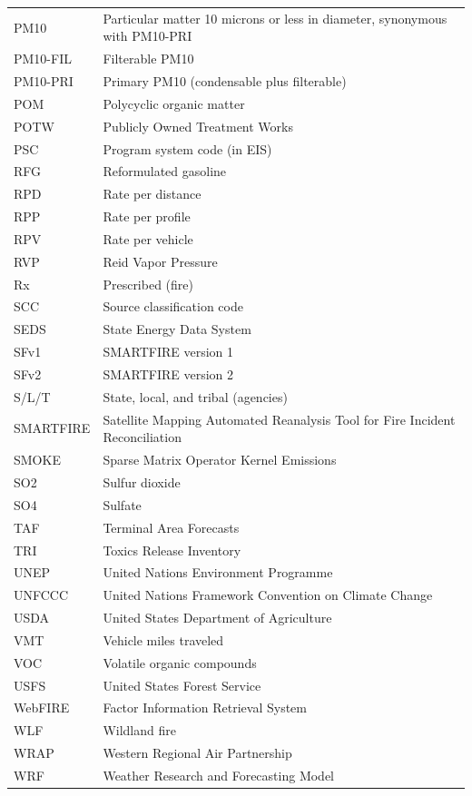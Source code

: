 \documentclass[
  11pt,
  oneside]{book}
\begin{document}
\begin{longtable}{ll}
PM10 & Particular matter 10 microns or less in diameter, synonymous with PM10-PRI\\
PM10-FIL & Filterable PM10\\
PM10-PRI & Primary PM10 (condensable plus filterable)\\
POM & Polycyclic organic matter\\
\addlinespace
POTW & Publicly Owned Treatment Works\\
PSC & Program system code (in EIS)\\
RFG & Reformulated gasoline\\
RPD & Rate per distance\\
RPP & Rate per profile\\
\addlinespace
RPV & Rate per vehicle\\
RVP & Reid Vapor Pressure\\
Rx & Prescribed (fire)\\
SCC & Source classification code\\
SEDS & State Energy Data System\\
\addlinespace
SFv1 & SMARTFIRE version 1\\
SFv2 & SMARTFIRE version 2\\
S/L/T & State, local, and tribal (agencies)\\
SMARTFIRE & Satellite Mapping Automated Reanalysis Tool for Fire Incident Reconciliation\\
SMOKE & Sparse Matrix Operator Kernel Emissions\\
\addlinespace
SO2 & Sulfur dioxide\\
SO4 & Sulfate\\
TAF & Terminal Area Forecasts\\
TRI & Toxics Release Inventory\\
UNEP & United Nations Environment Programme\\
\addlinespace
UNFCCC & United Nations Framework Convention on Climate Change\\
USDA & United States Department of Agriculture\\
VMT & Vehicle miles traveled\\
VOC & Volatile organic compounds\\
USFS & United States Forest Service\\
\addlinespace
WebFIRE & Factor Information Retrieval System\\
WLF & Wildland fire\\
WRAP & Western Regional Air Partnership\\
WRF & Weather Research and Forecasting Model\\
\bottomrule
\end{longtable}
\end{document}
